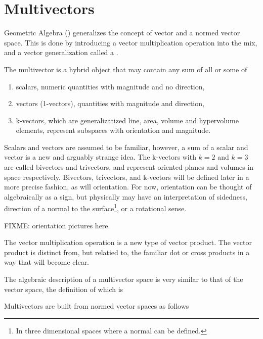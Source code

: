 \section{Multivectors}
Geometric Algebra () generalizes the concept of vector and a normed vector space.  This is done by introducing a vector multiplication operation into the mix, and a vector generalization called a .

The multivector is a hybrid object that may contain any sum of all or some of

\begin{enumerate}
   \item scalars, numeric quantities with magnitude and no direction,
   \item vectors (1-vectors), quantities with magnitude and direction,
   \item k-vectors, which are generalizatized line, area, volume and hypervolume elements, represent subspaces with orientation and magnitude.
\end{enumerate}

Scalars and vectors are assumed to be familiar, however, a sum of a scalar and vector is a new and arguably strange idea.  The k-vectors with \( k=2 \) and \( k = 3 \) are called bivectors and trivectors, and represent oriented planes and volumes in space respectively.
Bivectors, trivectors, and k-vectors will be defined later in a more precise fashion, as will orientation.  For now, orientation can be thought of algebraically as a sign, but physically may have an interpretation of sidedness, direction of a normal to the surface\footnote{In three dimensional spaces where a normal can be defined.}, or a rotational sense.

FIXME: orientation pictures here.

The vector multiplication operation is a new type of vector product.  The vector product is distinct from, but relatied to, the familiar dot or cross products in a way that will become clear.

The algebraic description of a multivector space is very similar to that of the vector space, the definition of which is

Multivectors are built from normed vector spaces as follows

